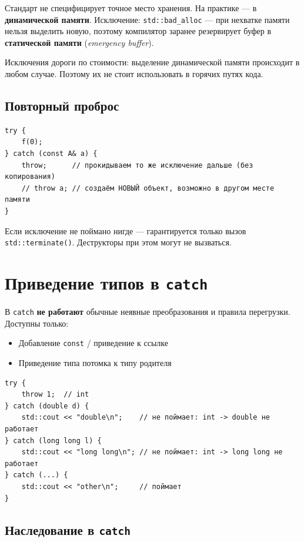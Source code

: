 \documentclass[a4paper,12pt]{article}
\begin{document}
Стандарт не специфицирует точное место хранения. На практике ---
в \textbf{динамической памяти}. Исключение: \texttt{std::bad\_alloc} ---
при нехватке памяти нельзя выделить новую, поэтому компилятор заранее
резервирует буфер в \textbf{статической памяти}
(\textit{emergency buffer}).

Исключения дороги по стоимости: выделение динамической памяти происходит
в любом случае. Поэтому их не стоит использовать в горячих путях кода.

\subsection{Повторный проброс}

\begin{lstlisting}
try {
    f(0);
} catch (const A& a) {
    throw;      // прокидываем то же исключение дальше (без копирования)
    // throw a; // создаём НОВЫЙ объект, возможно в другом месте памяти
}
\end{lstlisting}

Если исключение не поймано нигде --- гарантируется только вызов
\texttt{std::terminate()}. Деструкторы при этом могут не вызваться.

\section{Приведение типов в \texttt{catch}}

В \texttt{catch} \textbf{не работают} обычные неявные преобразования
и правила перегрузки. Доступны только:
\begin{itemize}
    \item Добавление \texttt{const} / приведение к ссылке
    \item Приведение типа потомка к типу родителя
\end{itemize}

\begin{lstlisting}
try {
    throw 1;  // int
} catch (double d) {
    std::cout << "double\n";    // не поймает: int -> double не работает
} catch (long long l) {
    std::cout << "long long\n"; // не поймает: int -> long long не работает
} catch (...) {
    std::cout << "other\n";     // поймает
}
\end{lstlisting}

\subsection{Наследование в \texttt{catch}}
\end{document}
